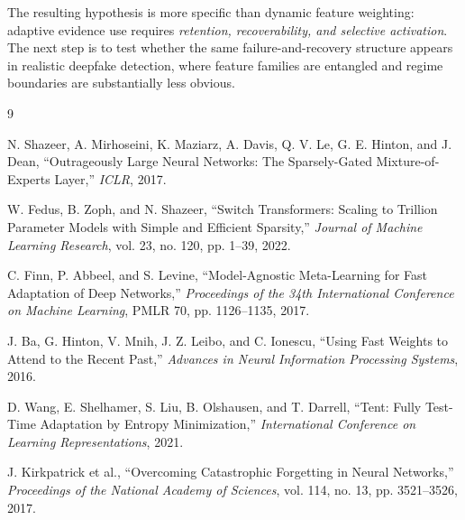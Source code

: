 \documentclass[10pt]{article}
\begin{document}
The resulting hypothesis is more specific than dynamic feature weighting: adaptive evidence use requires \emph{retention, recoverability, and selective activation}. The next step is to test whether the same failure-and-recovery structure appears in realistic deepfake detection, where feature families are entangled and regime boundaries are substantially less obvious.

\begin{thebibliography}{9}

N. Shazeer, A. Mirhoseini, K. Maziarz, A. Davis, Q. V. Le, G. E. Hinton, and J. Dean,
``Outrageously Large Neural Networks: The Sparsely-Gated Mixture-of-Experts Layer,''
\emph{ICLR}, 2017.

W. Fedus, B. Zoph, and N. Shazeer,
``Switch Transformers: Scaling to Trillion Parameter Models with Simple and Efficient Sparsity,''
\emph{Journal of Machine Learning Research}, vol. 23, no. 120, pp. 1--39, 2022.

C. Finn, P. Abbeel, and S. Levine,
``Model-Agnostic Meta-Learning for Fast Adaptation of Deep Networks,''
\emph{Proceedings of the 34th International Conference on Machine Learning},
PMLR 70, pp. 1126--1135, 2017.

J. Ba, G. Hinton, V. Mnih, J. Z. Leibo, and C. Ionescu,
``Using Fast Weights to Attend to the Recent Past,''
\emph{Advances in Neural Information Processing Systems}, 2016.

D. Wang, E. Shelhamer, S. Liu, B. Olshausen, and T. Darrell,
``Tent: Fully Test-Time Adaptation by Entropy Minimization,''
\emph{International Conference on Learning Representations}, 2021.

J. Kirkpatrick et al.,
``Overcoming Catastrophic Forgetting in Neural Networks,''
\emph{Proceedings of the National Academy of Sciences},
vol. 114, no. 13, pp. 3521--3526, 2017.

\end{thebibliography}
\end{document}

